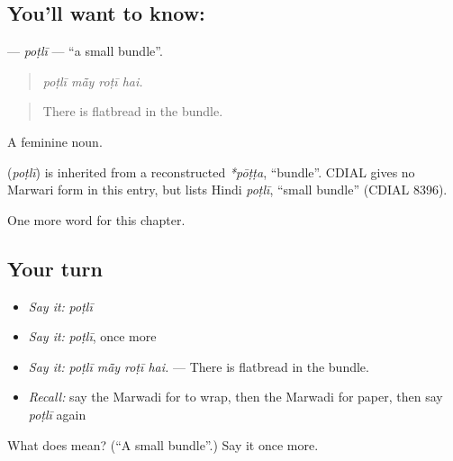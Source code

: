 \subsection*{You'll want to know: }
\textbf{} — \emph{poṭlī} — \textquotedblleft{}a small bundle\textquotedblright{}.

\begin{quote}
   
\end{quote}

\begin{quote}
\emph{poṭlī mā̃y roṭī hai.}
\end{quote}

\begin{quote}
There is flatbread in the bundle.
\end{quote}

A feminine noun.

\begin{cousinweb}
\textbf{} (\emph{poṭlī}) is inherited from a reconstructed \emph{*pōṭṭa}, \textquotedblleft{}bundle\textquotedblright{}. CDIAL gives no Marwari form in this entry, but lists Hindi \emph{poṭlī}, \textquotedblleft{}small bundle\textquotedblright{} (CDIAL 8396).
\end{cousinweb}

\begin{grammarlens}[title={What you've built}]
One more word for this chapter.
\end{grammarlens}

\subsection*{Your turn}
\begin{itemize}
\raggedright
  \item \emph{Say it:} \emph{poṭlī}
  \item \emph{Say it:} \emph{poṭlī}, once more
  \item \emph{Say it:} \emph{poṭlī mā̃y roṭī hai.} — There is flatbread in the bundle.
  \item \emph{Recall:} say the Marwadi for to wrap, then the Marwadi for paper, then say \emph{poṭlī} again
\end{itemize}

\begin{tcolorbox}[breakable,colback=teal!4,colframe=teal!35!black,title={Before you move on}]
What does  mean? (\textquotedblleft{}A small bundle\textquotedblright{}.) Say it once more.
\end{tcolorbox}
